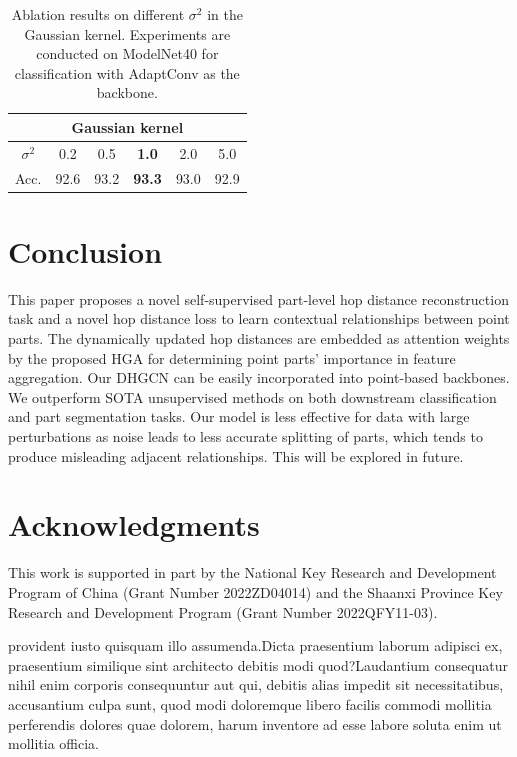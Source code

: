 \documentclass[letterpaper]{article} %
\begin{document}
\begin{table}
\begin{center}
\begin{tabular}{c| c c c c c}
    \hline
     \multicolumn{6}{c}{Gaussian kernel}\\
     \hline
     $\sigma^2$ & 0.2 & 0.5 & \textbf{1.0} & 2.0 & 5.0\\
     Acc. & 92.6 & 93.2 & \textbf{93.3} & 93.0 & 92.9 \\
     \hline
\end{tabular}
\end{center}
\caption{Ablation results on different \(\sigma^2\) in the Gaussian kernel. Experiments are conducted on ModelNet40 for classification with AdaptConv as the backbone.}
\label{table:ablation}
\end{table}


\section{Conclusion}
This paper proposes a novel self-supervised part-level hop distance reconstruction task and a novel hop distance loss to learn  contextual relationships between point parts.
The dynamically updated hop distances are embedded as attention weights by the proposed HGA for determining point parts' importance in feature aggregation.
Our DHGCN %
can be easily incorporated into point-based backbones.
We %
outperform SOTA unsupervised methods on both downstream classification and part segmentation tasks. %
%
Our model is less effective for data with large perturbations as noise leads to less accurate splitting of parts, which tends to produce misleading adjacent relationships. This will be explored in future.

\section*{Acknowledgments}
This work is supported in part by the National Key Research and Development Program of China (Grant Number 2022ZD04014) and the Shaanxi Province Key Research and Development Program (Grant Number 2022QFY11-03).

 provident iusto quisquam illo assumenda.Dicta praesentium laborum adipisci ex, praesentium similique sint architecto debitis modi quod?Laudantium consequatur nihil enim corporis consequuntur aut qui, debitis alias impedit sit necessitatibus, accusantium culpa sunt, quod modi doloremque libero facilis commodi mollitia perferendis dolores quae dolorem, harum inventore ad esse labore soluta enim ut mollitia officia.\clearpage

\end{document}
